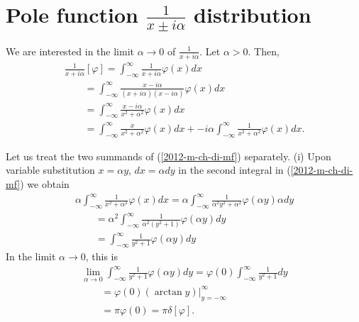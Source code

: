 \section{Pole function $\frac{1}{x\pm i\alpha}$ distribution}

We are interested in the limit $\alpha  \rightarrow 0$ of $\frac{1}{x+i\alpha}$.
Let  $\alpha >0$. Then,
\begin{equation}
\begin{split}
\frac{1}{x+i\alpha} \left[ \varphi \right]
=
\int_{-\infty}^\infty  \frac{1}{x+i\alpha}  \varphi(x) dx
\\
\qquad
=
\int_{-\infty}^\infty   \frac{x-i\alpha}{ (x+i\alpha)(x-i\alpha) }   \varphi(x) dx
\\
\qquad
=
\int_{-\infty}^\infty   \frac{x-i\alpha}{x^2+ \alpha^2}   \varphi(x) dx
\\
\qquad
=
\int_{-\infty}^\infty   \frac{x}{x^2+ \alpha^2}   \varphi(x) dx
+
-i\alpha \int_{-\infty}^\infty   \frac{1}{x^2+ \alpha^2}   \varphi(x) dx
.
\end{split}
\label{2012-m-ch-di-mf}
\end{equation}

Let us treat the two summands of (\ref{2012-m-ch-di-mf}) separately.
(i) Upon variable substitution  $x = \alpha y$, $dx =\alpha dy$ in the second integral in (\ref{2012-m-ch-di-mf}) we obtain
\begin{equation}
\begin{split}
\alpha \int_{-\infty}^\infty   \frac{1}{x^2+ \alpha^2}   \varphi(x) dx
=
\alpha \int_{-\infty}^\infty   \frac{1}{\alpha^2y^2+ \alpha^2}   \varphi(\alpha y) \alpha dy
\\
\qquad
=
\alpha^2 \int_{-\infty}^\infty   \frac{1}{\alpha^2(y^2+ 1)}   \varphi(\alpha y)   dy
\\
\qquad
=
  \int_{-\infty}^\infty   \frac{1}{  y^2+ 1 }   \varphi(\alpha y)   dy
\end{split}
\end{equation}
In the limit $\alpha  \rightarrow 0$, this is
\begin{equation}
\begin{split}
\lim_{\alpha  \rightarrow 0} \int_{-\infty}^\infty   \frac{1}{  y^2+ 1 }   \varphi(\alpha y)   dy
=
\varphi(0) \int_{-\infty}^\infty   \frac{1}{  y^2+ 1 }       dy
\\
\qquad =
\varphi(0) \left. \left( \arctan y \right) \right|_{y=-\infty}^{\infty}
\\
\qquad =
\pi \varphi(0) =
\pi \delta [\varphi ]
.
\end{split}
\end{equation}

